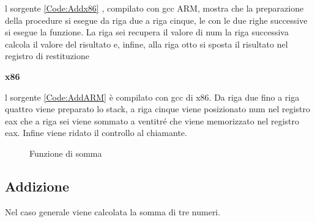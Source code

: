 \documentclass[12pt,a4paper]{report}
\begin{document}
\vspace{0.3 cm}

l sorgente  \ref{Code:Addx86} , compilato con gcc ARM, mostra che la preparazione della procedure si esegue da riga due a riga cinque, le con le due righe successive si esegue la funzione. La riga sei recupera il valore di num la riga successiva calcola il valore del risultato e, infine, alla riga otto si sposta il risultato nel registro di restituzione


\vspace{0.3 cm}
\textbf{x86}

l sorgente  \ref{Code:AddARM} è compilato con gcc di x86.  Da riga due fino a riga quattro viene preparato lo stack, a riga cinque viene posizionato num nel registro eax che a riga sei viene sommato a ventitré che viene memorizzato nel registro eax. Infine viene ridato il controllo al chiamante.

\vspace{0.3 cm}

\begin{figure}[h!]
     
     \begin{subfigure}{0.3\textwidth}
  
        


     \end{subfigure}
     \hfill
     \begin{subfigure}{0.3\textwidth}
         
          


     \end{subfigure}
     \hfill
     \begin{subfigure}{0.3\textwidth}
         
          


     \end{subfigure}
    
        \caption{Funzione di somma}
        
\end{figure}

\subsection{Addizione}
Nel caso generale viene calcolata la somma di tre numeri.

\end{document}
